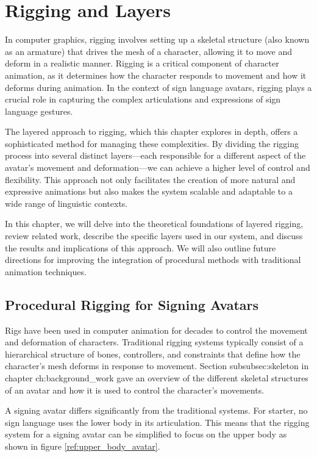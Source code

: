 \documentclass[../../main.tex]{subfiles}
\begin{document}
\chapter{Rigging and Layers}
\label{ch:rigging_layers}

In computer graphics, rigging involves setting up a skeletal structure (also known as an armature) that drives the mesh of a character, allowing it to move and deform in a realistic manner. Rigging is a critical component of character animation, as it determines how the character responds to movement and how it deforms during animation. In the context of sign language avatars, rigging plays a crucial role in capturing the complex articulations and expressions of sign language gestures.

The layered approach to rigging, which this chapter explores in depth, offers a sophisticated method for managing these complexities. By dividing the rigging process into several distinct layers—each responsible for a different aspect of the avatar’s movement and deformation—we can achieve a higher level of control and flexibility. This approach not only facilitates the creation of more natural and expressive animations but also makes the system scalable and adaptable to a wide range of linguistic contexts.

In this chapter, we will delve into the theoretical foundations of layered rigging, review related work, describe the specific layers used in our system, and discuss the results and implications of this approach. We will also outline future directions for improving the integration of procedural methods with traditional animation techniques.

\section{Procedural Rigging for Signing Avatars}

Rigs have been used in computer animation for decades to control the movement and deformation of characters. Traditional rigging systems typically consist of a hierarchical structure of bones, controllers, and constraints that define how the character’s mesh deforms in response to movement. Section {subsubsec:skeleton} in chapter {ch:background_work} gave an overview of the different skeletal structures of an avatar and how it is used to control the character’s movements.

A signing avatar differs significantly from the traditional systems. For starter, no sign language uses the lower body in its articulation. This means that the rigging system for a signing avatar can be simplified to focus on the upper body as shown in figure \ref{ref:upper_body_avatar}. 
\end{document}
